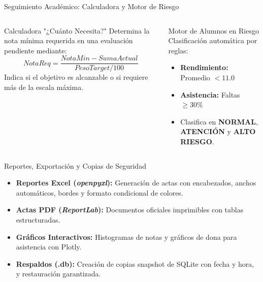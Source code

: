 \documentclass[aspectratio=169,10pt]{beamer}
\begin{document}
\begin{frame}{Seguimiento Académico: Calculadora y Motor de Riesgo}
  \begin{columns}
      \begin{block}{Calculadora "¿Cuánto Necesita?"}
        Determina la nota mínima requerida en una evaluación pendiente mediante:
        \[ NotaReq = \frac{NotaMin - SumaActual}{PesoTarget / 100} \]
        Indica si el objetivo es alcanzable o si requiere más de la escala máxima.
      \end{block}
      \begin{alertblock}{Motor de Alumnos en Riesgo}
        Clasificación automática por reglas:
        \begin{itemize}
          \item \textbf{Rendimiento:} Promedio $< 11.0$
          \item \textbf{Asistencia:} Faltas $\ge 30\%$
          \item Clasifica en \textbf{NORMAL}, \textbf{ATENCIÓN} y \textbf{ALTO RIESGO}.
        \end{itemize}
      \end{alertblock}
  \end{columns}
\end{frame}

\begin{frame}{Reportes, Exportación y Copias de Seguridad}
  \begin{itemize}
    \item \textbf{Reportes Excel (\textit{openpyxl}):} Generación de actas con encabezados, anchos automáticos, bordes y formato condicional de colores.
    \item \textbf{Actas PDF (\textit{ReportLab}):} Documentos oficiales imprimibles con tablas estructuradas.
    \item \textbf{Gráficos Interactivos:} Histogramas de notas y gráficos de dona para asistencia con Plotly.
    \item \textbf{Respaldos (.db):} Creación de copias snapshot de SQLite con fecha y hora, y restauración garantizada.
  \end{itemize}
\end{frame}
\end{document}
